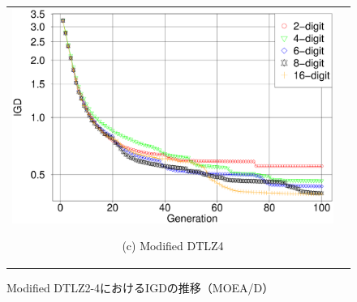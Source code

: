 \documentclass[../main/main]{subfiles}
\begin{document}
\begin{figure}[htbp]
\begin{tabular}{cc}
\begin{minipage}{0.32\hsize}
\includegraphics[width=1\linewidth]{../figures/MOEAD/DTLZ4_another_IGD.eps}
\begin{center}
{\footnotesize (c) Modified DTLZ4}
\end{center}
\end{minipage}
\end{tabular}
\caption{Modified DTLZ2-4におけるIGDの推移（MOEA/D）}
\label{fig:igd_mod_moead}
\end{figure}
\end{document}
